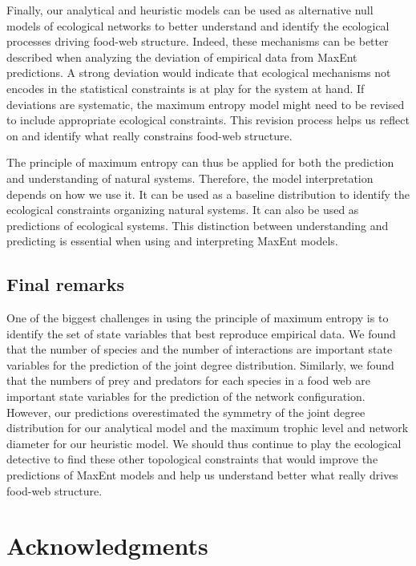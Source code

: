 \documentclass[11pt]{article}
\begin{document}
Finally, our analytical and heuristic models can be used as alternative
null models of ecological networks to better understand and identify the
ecological processes driving food-web structure. Indeed, these
mechanisms can be better described when analyzing the deviation of
empirical data from MaxEnt predictions. A strong deviation would
indicate that ecological mechanisms not encodes in the statistical
constraints is at play for the system at hand. If deviations are
systematic, the maximum entropy model might need to be revised to
include appropriate ecological constraints. This revision process helps
us reflect on and identify what really constrains food-web structure.

The principle of maximum entropy can thus be applied for both the
prediction and understanding of natural systems. Therefore, the model
interpretation depends on how we use it. It can be used as a baseline
distribution to identify the ecological constraints organizing natural
systems. It can also be used as predictions of ecological systems. This
distinction between understanding and predicting is essential when using
and interpreting MaxEnt models.

\hypertarget{final-remarks}{%
\subsection{Final remarks}\label{final-remarks}}

One of the biggest challenges in using the principle of maximum entropy
is to identify the set of state variables that best reproduce empirical
data. We found that the number of species and the number of interactions
are important state variables for the prediction of the joint degree
distribution. Similarly, we found that the numbers of prey and predators
for each species in a food web are important state variables for the
prediction of the network configuration. However, our predictions
overestimated the symmetry of the joint degree distribution for our
analytical model and the maximum trophic level and network diameter for
our heuristic model. We should thus continue to play the ecological
detective to find these other topological constraints that would improve
the predictions of MaxEnt models and help us understand better what
really drives food-web structure.

\hypertarget{acknowledgments}{%
\section{Acknowledgments}\label{acknowledgments}}
\end{document}

